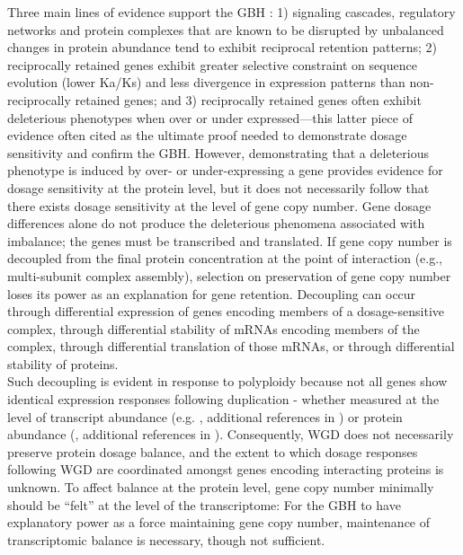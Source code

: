 \documentclass[11pt]{article}
\begin{document}
Three main lines of evidence support the GBH \citep{tasdighian2017, freeling2009, hou2018, edger2009}: 1) signaling cascades, regulatory networks and protein complexes that are known to be disrupted by unbalanced changes in protein abundance tend to exhibit reciprocal retention patterns; 2) reciprocally retained genes exhibit greater selective constraint on sequence evolution (lower Ka/Ks) and less divergence in expression patterns than non-reciprocally retained genes; and 3) reciprocally retained genes often exhibit deleterious phenotypes when over or under expressed---this latter piece of evidence often cited as the ultimate proof needed to demonstrate dosage sensitivity and confirm the GBH.
However, demonstrating that a deleterious phenotype is induced by over- or under-expressing a gene provides evidence for dosage sensitivity at the protein level, but it does not necessarily follow that there exists dosage sensitivity at the level of gene copy number. Gene dosage differences alone do not produce the deleterious phenomena associated with imbalance; the genes must be transcribed and translated. If gene copy number is decoupled from the final protein concentration at the point of interaction (e.g., multi-subunit complex assembly), selection on preservation of gene copy number loses its power as an explanation for gene retention. Decoupling can occur through differential expression of genes encoding members of a dosage-sensitive complex, through differential stability of mRNAs encoding members of the complex, through differential translation of those mRNAs, or through differential stability of proteins.\\

Such decoupling is evident in response to polyploidy because not all genes show identical expression responses following duplication -   whether measured at the level of transcript abundance (e.g. \cite{pirrello2018, hou2018, guo1996, riddle2006, robinson2018, stupar2007, yu2010}, additional references in \cite{doyle2019}) or protein abundance (\cite{birchler1981, yao2011, zhu2012, soltis2016, deng2017, fan2017, wang2017, yan2017},  additional references in \cite{doyle2019}). Consequently, WGD does not necessarily preserve protein dosage balance, and the extent to which dosage responses following WGD are coordinated amongst genes encoding interacting proteins is unknown. 
To affect balance at the protein level, gene copy number minimally should be ``felt'' at the level of the transcriptome: For the GBH to have explanatory power as a force maintaining gene copy number, maintenance of transcriptomic balance is necessary, though not sufficient.\\
\end{document}
